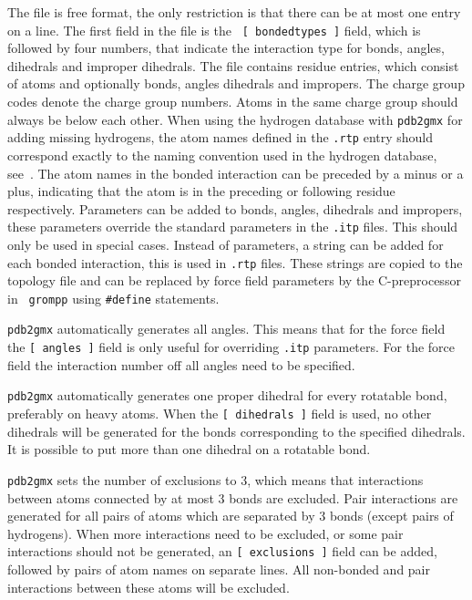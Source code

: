 The file is free format, the only restriction is that there can be at
most one entry on a line.  The first field in the file is the {\tt
[~bondedtypes~]} field, which is followed by four numbers, that
indicate the interaction type for bonds, angles, dihedrals and
improper dihedrals.  The file contains residue entries, which consist
of atoms and optionally bonds, angles dihedrals and impropers.  The
charge group codes denote the charge group numbers. Atoms in the same
charge group should always be below each other. When using the
hydrogen database with {\tt pdb2gmx} for adding missing hydrogens, the
atom names defined in the {\tt .rtp} entry should correspond exactly
to the naming convention used in the hydrogen database,
see~. The atom names in the bonded interaction can be
preceded by a minus or a plus, indicating that the atom is in the
preceding or following residue respectively.  Parameters can be added
to bonds, angles, dihedrals and impropers, these parameters override
the standard parameters in the {\tt .itp} files.  This should only be
used in special cases. Instead of parameters, a string can be added
for each bonded interaction, this is used in  {\tt .rtp}
files. These strings are copied to the topology file and can be
replaced by force field parameters by the C-preprocessor in {\tt
grompp} using {\tt \#define} statements.

{\tt pdb2gmx} automatically generates all angles. This means that for the
{\gromacs} force field
the {\tt [~angles~]} field is only useful for overriding {\tt .itp}
parameters. For the {} force field the interaction number
off all angles need to be specified.

{\tt pdb2gmx} automatically generates one proper dihedral for every rotatable
bond, preferably on heavy atoms. When the {\tt [~dihedrals~]} field is used,
no other dihedrals will be generated for the bonds corresponding to the
specified  dihedrals. It is possible to put more than one dihedral on a
rotatable bond. 

{\tt pdb2gmx} sets the number of exclusions to 3, which
means that interactions between atoms connected by at most 3 bonds are
excluded. Pair interactions are generated for all pairs of atoms which are
separated by 3 bonds (except pairs of hydrogens).
When more interactions need to be excluded, or some pair interactions should
not be generated, an {\tt [~exclusions~]} field can be added, followed by
pairs of atom names on separate lines. All non-bonded and pair interactions
between these atoms will be excluded.

